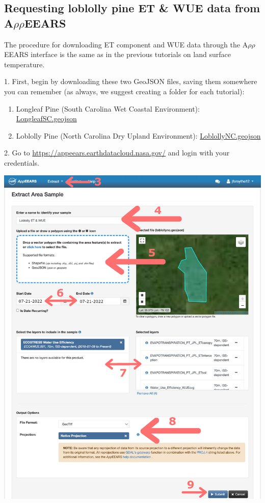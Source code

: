 \documentclass[oneside,a4paper,11pt,explicit]{book}
\begin{document}
\subsection{Requesting loblolly pine ET \& WUE data from A$\rho\rho$EEARS}

The procedure for downloading ET component and WUE data through the A$\rho\rho$EEARS interface is the same as in the previous tutorials on land surface temperature.

1. First, begin by downloading these two GeoJSON files, saving them somewhere you can remember (as always, we suggest creating a folder for each tutorial):

\begin{enumerate}
	\item Longleaf Pine (South Carolina Wet Coastal Environment): \href{https://jeremydforsythe.github.io/icecream-tutorials/Tutorial7_Evapotranspiration2/LongleafSC Shapefile/LongleafSC.geojson}{LongleafSC.geojson}
	\item Loblolly Pine (North Carolina Dry Upland Environment): \href{https://jeremydforsythe.github.io/icecream-tutorials/Tutorial7_Evapotranspiration2/LoblollyNC Shapefile/LoblollyNC.geojson}{LoblollyNC.geojson}
\end{enumerate}
 


2. Go to \href{https://appeears.earthdatacloud.nasa.gov/}{https://appeears.earthdatacloud.nasa.gov/} and login with your credentials. 

\centerline{\includegraphics[width=.6\textwidth]{WUERequest.png}}
\end{document}
